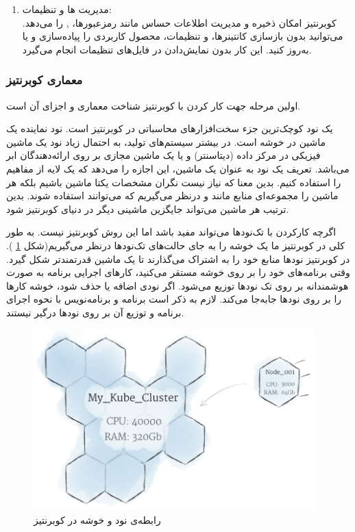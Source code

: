 \begin{enumerate}
	\item
	مدیریت 
	ها و تنظیمات:\\
	کوبرنتیز امکان ذخیره و مدیریت اطلاعات حساس مانند رمز‌عبورها، 
	, 
	را می‌دهد. می‌توانید بدون بازسازی کانتینرها، 
	و تنظیمات، محصول کاربردی را پیاده‌سازی و یا به‌روز کنید. این کار بدون نمایش‌دادن 
	در فایل‌های تنظیمات انجام می‌گیرد.
	
\end{enumerate}

\newpage

\subsubsection{معماری کوبرنتیز}
اولین مرحله جهت کار کردن با کوبرنتیز شناخت معماری و اجزای آن است.

یک نود کوچک‌ترین جزء سخت‌افزارهای محاسباتی در کوبرنتیز است. نود نماینده یک ماشین در خوشه است. در بیشتر سیستم‌های تولید، به احتمال زیاد نود یک ماشین فیزیکی در مرکز داده (‌دیتاسنتر) و یا یک ماشین مجازی بر روی ارائه‌دهندگان ابر می‌باشد. تعریف یک نود به عنوان یک ماشین، ‌این اجازه را می‌دهد که یک لایه از مفاهیم را استفاده  کنیم. بدین معنا که نیاز نیست نگران مشخصات یکتا ماشین باشیم بلکه هر ماشین را مجموعه‌ای منابع مانند 
و
درنظر می‌گیریم که می‌توانند استفاده شوند. بدین ترتیب هر ماشین می‌تواند جایگزین ماشینی دیگر در دنیای کوبرنتیز شود.

اگرچه کارکردن با تک‌نودها می‌تواند مفید باشد اما این روش کوبرنتیز نیست. به طور کلی در کوبرنتیز ما یک خوشه را به جای حالت‌های تک‌نودها درنظر می‌گیریم(شکل
\ref{تصویر 2-9}
). در کوبرنتیز نودها منابع خود را به اشتراک می‌گذارند تا یک ماشین قدرتمند‌تر شکل گیرد. وقتی برنامه‌های خود را بر روی خوشه مستقر می‌کنید، کارهای اجرایی برنامه به صورت هوشمندانه بر روی تک نودها توزیع می‌شود. اگر نودی اضافه یا حذف شود، خوشه کارها را بر روی نودها  جابه‌جا می‌کند. لازم به ذکر است برنامه و برنامه‌نویس با نحوه اجرای برنامه و توزیع آن بر روی نودها درگیر نیستند.

\begin{figure}[!h]
	\centering
	\includegraphics[height=7cm]{fig2-9}
	\caption{رابطه‌ی نود و خوشه در کوبرنتیز}
	\label{تصویر 2-9}
\end{figure}

